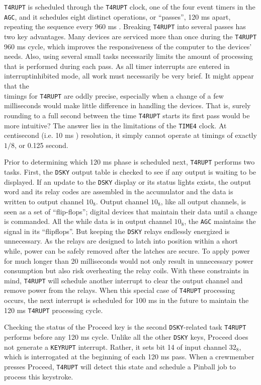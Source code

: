 \documentclass[refcap, oxford]{ahsan}
\begin{document}
\texttt{T4RUPT} is scheduled through the \texttt{T4RUPT} clock, one of the four event timers in the \texttt{AGC}, and it schedules eight distinct operations, or ``passes'', 120 ms apart, repeating the sequence every 960 ms . Breaking \texttt{T4RUPT} into several passes has two key advantages. Many devices are serviced more than once during the \texttt{T4RUPT} 960 ms cycle, which improves the responsiveness of the computer to the devices' needs. Also, using several small tasks necessarily limits the amount of processing that is performed during each pass. As all timer interrupts are entered in interruptinhibited mode, all work must necessarily be very brief. It might appear that the\\
timings for \texttt{T4RUPT} are oddly precise, especially when a change of a few milliseconds would make little difference in handling the devices. That is, surely rounding to a full second between the time \texttt{T4RUPT} starts its first pass would be more intuitive? The answer lies in the limitations of the \texttt{TIME4} clock. At centisecond (i.e. 10 ms ) resolution, it simply cannot operate at timings of exactly $1 / 8$, or 0.125 second.

Prior to determining which 120 ms phase is scheduled next, \texttt{T4RUPT} performs two tasks. First, the \texttt{DSKY} output table is checked to see if any output is waiting to be displayed. If an update to the \texttt{DSKY} display or its status lights exists, the output word and its relay codes are assembled in the accumulator and the data is written to output channel $10_{8}$. Output channel $10_{8}$, like all output channels, is seen as a set of ``flip-flops''; digital devices that maintain their data until a change is commanded. All the while data is in output channel $10_{8}$, the \texttt{AGC} maintains the signal in its ``flipflops''. But keeping the \texttt{DSKY} relays endlessly energized is unnecessary. As the relays are designed to latch into position within a short while, power can be safely removed after the latches are secure. To apply power for much longer than 20 milliseconds would not only result in unnecessary power consumption but also risk overheating the relay coils. With these constraints in mind, \texttt{T4RUPT} will schedule another interrupt to clear the output channel and remove power from the relays. When this special case of \texttt{T4RUPT} processing occurs, the next interrupt is scheduled for 100 ms in the future to maintain the 120 ms \texttt{T4RUPT} processing cycle.

Checking the status of the Proceed key is the second \texttt{DSKY}-related task \texttt{T4RUPT} performs before any 120 ms cycle. Unlike all the other \texttt{DSKY} keys, Proceed does not generate a \texttt{KEYRUPT} interrupt. Rather, it sets bit 14 of input channel $32_{8}$, which is interrogated at the beginning of each 120 ms pass. When a crewmember presses Proceed, \texttt{T4RUPT} will detect this state and schedule a Pinball job to process this keystroke.
\end{document}
